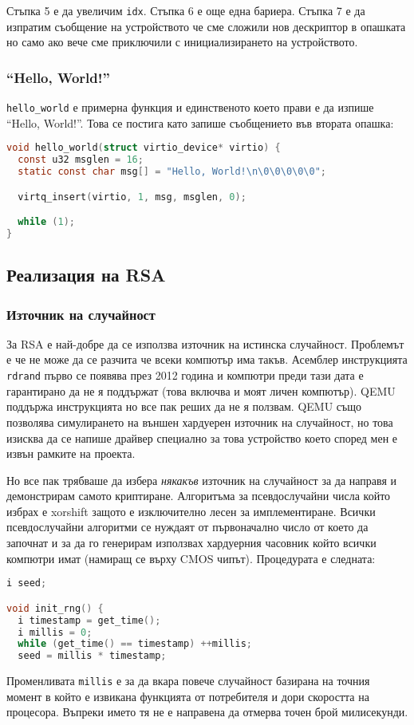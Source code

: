 Стъпка 5 е да увеличим {\tt idx}. Стъпка 6 е още една бариера. Стъпка 7 е да изпратим съобщение на устройството че сме сложили нов дескриптор в опашката но само ако вече сме приключили с инициализирането на устройството.


\subsubsection{``Hello, World!''}
{\tt hello\_world} е примерна функция и единственото което прави е да изпише ``Hello, World!''. Това се постига като запише съобщението във втората опашка:
\begin{lstlisting}[language=C]
void hello_world(struct virtio_device* virtio) {
  const u32 msglen = 16;
  static const char msg[] = "Hello, World!\n\0\0\0\0\0";

  virtq_insert(virtio, 1, msg, msglen, 0);

  while (1);
}
\end{lstlisting}

\subsection{Реализация на RSA}
\subsubsection{Източник на случайност}
За RSA е най-добре да се използва източник на истинска случайност. Проблемът е че не може да се разчита че всеки компютър има такъв. Асемблер инструкцията {\tt rdrand} първо се появява през 2012 година и компютри преди тази дата е гарантирано да не я поддържат (това включва и моят личен компютър). QEMU поддържа инструкцията но все пак реших да не я ползвам. QEMU също позволява симулирането на външен хардуерен източник на случайност, но това изисква да се напише драйвер специално за това устройство което според мен е извън рамките на проекта.

Но все пак трябваше да избера \textit{някакъв} източник на случайност за да направя и демонстрирам самото криптиране. Алгоритъма за псевдослучайни числа който избрах е xorshift защото е изключително лесен за имплементиране. Всички псевдослучайни алгоритми се нуждаят от първоначално число от което да започнат и за да го генерирам използвах хардуерния часовник който всички компютри имат (намиращ се върху CMOS чипът). Процедурата е следната:
\begin{lstlisting}[language=C]
i seed;

void init_rng() {
  i timestamp = get_time();
  i millis = 0;
  while (get_time() == timestamp) ++millis;
  seed = millis * timestamp;
\end{lstlisting}
Променливата {\tt millis} е за да вкара повече случайност базирана на точния момент в който е извикана функцията от потребителя и дори скоростта на процесора. Въпреки името тя не е направена да отмерва точен брой милисекунди.

